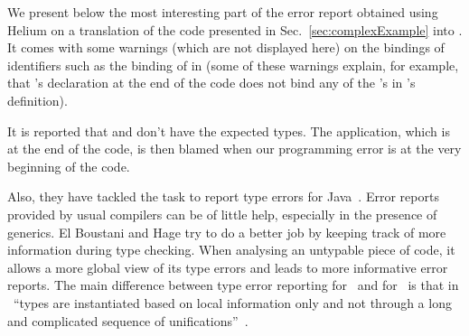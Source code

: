 \documentclass{jfp1}
\begin{document}
We present below the most interesting part of the error report
obtained using Helium on a translation of the code presented in
Sec.~\ref{sec:complexExample} into \HASKELL.  It comes with some
warnings (which are not displayed here) on the bindings of identifiers
such as the binding of  in 
(some of these warnings explain, for example, that 's
declaration at the end of the code does not bind any of the
's in 's definition).


It is reported that
 and  don't have the expected
types.  The application, which is at the end of the code, is then
blamed when our programming error is at the very beginning of the
code.






Also, they have
tackled the task to report type errors for
Java~\cite{Boustani+Hage:2009,Boustani+Hage:2010}.
Error reports
provided by usual
compilers can be of little help, especially in the presence of
generics.  El Boustani and Hage try to do
a better job by keeping
track of more information during type checking.
When analysing an untypable piece of code, it
allows a more global view of its type errors and leads to more
informative error reports.  The main difference between type error
reporting for \SML\ and for \JAVA\ is that in \JAVA\ ``types are
instantiated based on local information only and not through a long
and complicated sequence of unifications''~\cite{Boustani+Hage:2009}.



\end{document}
